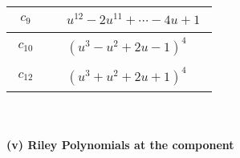 \documentclass[1p]{elsarticle_modified}
\theoremstyle{definition}
\begin{document}
\begin{tabular}{m{50pt}|m{274pt}}
\hline $$\begin{aligned}c_{9}\end{aligned}$$&$\begin{aligned}
&u^{12}-2 u^{11}+\cdots-4 u+1
\end{aligned}$\\
\hline $$\begin{aligned}c_{10}\end{aligned}$$&$\begin{aligned}
&(u^3- u^2+2 u-1)^4
\end{aligned}$\\
\hline $$\begin{aligned}c_{12}\end{aligned}$$&$\begin{aligned}
&(u^3+u^2+2 u+1)^4
\end{aligned}$\\
\hline
\end{tabular}\\~\\
\newpage\renewcommand{\arraystretch}{1}
\flushleft \textbf{(v) Riley Polynomials at the component}\newline \\
\end{document}
